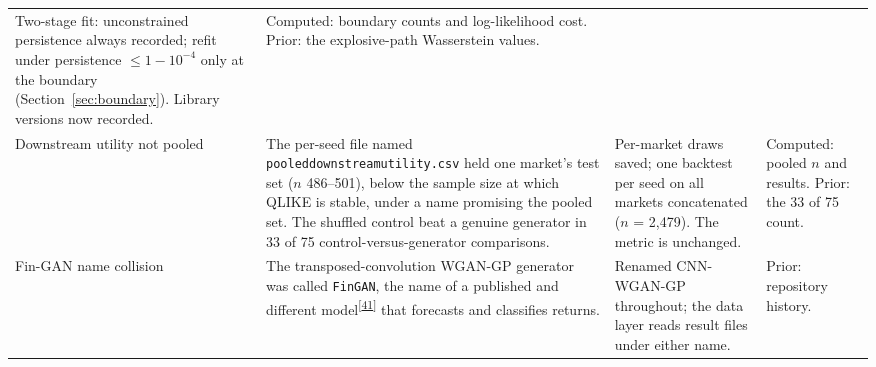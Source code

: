 \documentclass[11pt,a4paper]{article}
\makeatletter
\newcommand{\tcite}[1]{\textsuperscript{[\hyperlink{R:#1}{#1}]}}
\DeclareRobustCommand{\_}{\ifmmode\nfss@text{\textunderscore}\else\textunderscore\allowbreak\fi}
\makeatother
\begin{document}
{\begin{xltabular}{\linewidth}{@{}>{\raggedright\arraybackslash}p{3.0cm} >{\raggedright\arraybackslash}X >{\raggedright\arraybackslash}p{3.3cm} >{\raggedright\arraybackslash}p{2.6cm}@{}}
Two-stage fit: unconstrained persistence always recorded; refit under persistence $\le1-10^{-4}$ only at the boundary (Section~\ref{sec:boundary}). Library versions now recorded. &
Computed: boundary counts and log-likelihood cost. Prior: the explosive-path Wasserstein values. \\
\addlinespace
Downstream utility not pooled &
The per-seed file named \texttt{pooled\_downstream\_utility.csv} held one market's test set ($n$ 486--501), below the sample size at which QLIKE is stable, under a name promising the pooled set. The shuffled control beat a genuine generator in 33 of 75 control-versus-generator comparisons. &
Per-market draws saved; one backtest per seed on all markets concatenated ($n$ = 2,479). The metric is unchanged. &
Computed: pooled $n$ and results. Prior: the 33 of 75 count. \\
\addlinespace
Fin-GAN name collision &
The transposed-convolution WGAN-GP generator was called \texttt{FinGAN}, the name of a published and different model\tcite{41} that forecasts and classifies returns. &
Renamed CNN-WGAN-GP throughout; the data layer reads result files under either name. &
Prior: repository history. \\
\end{xltabular}
}
\end{document}
